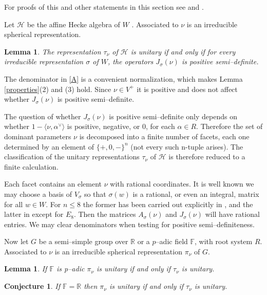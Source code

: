 \documentclass[11pt]{amsart}
\newtheorem{lemma}[equation]{Lemma}
\newtheorem{conjecture}[equation]{Conjecture}
\renewcommand{\H}{{\mathcal H}}
\newcommand{\ch}[1]{#1^\vee}
\newcommand\brach[2]{\langle#1,\ch#2\rangle}
\begin{document}
For proofs of this and other statements in this section see
\cite{barbasch_spherical} and \cite{atlas_papers}.

Let $\H$ be the affine Hecke algebra of $W$ \cite[Chapter 7]{humphreys_coxeter}.
Associated to $\nu$ is an irreducible spherical representation.

\begin{lemma}
The representation $\tau_\nu$ of $\H$ is unitary if and only if 
for every irreducible representation $\sigma$ of $W$, the operators
$J_\sigma(\nu)$ is positive semi--definite.
\end{lemma}


The denominator in \eqref{A} is a convenient normalization, which
makes Lemma \ref{properties}(2) and (3) hold. 
Since
$\nu\in V^+$ it is positive and does not affect whether
$J_\sigma(\nu)$ is positive semi--definite.

The question of whether $J_\sigma(\nu)$ is positive
semi--definite only depends on whether $1-\brach\nu\alpha$ is
positive, negative, or $0$, for each $\alpha\in R$. Therefore the set
of dominant parameters $\nu$ is decomposed into a finite number of
facets, each one determined by an element of $\{+,0,-\}^n$ (not every
such n-tuple arises). 
The classification of the unitary representations $\tau_\nu$ of 
$\H$ is therefore reduced to a finite calculation.


Each facet contains an element $\nu$ with rational coordinates. It is
well known we may choose a basis of $V_\sigma$ so that $\sigma(w)$ is
a rational, or even an integral, matrix for all $w\in W$. For $n\le 8$
the former has been carried out explicitly in \cite{stembridge_models}, and
the latter in \cite{adams_models} except for $E_8$. Then the matrices
$A_\sigma(\nu)$ and $J_\sigma(\nu)$ will have rational
entries.  We may clear denominators when testing for positive
semi--definiteness. 

Now let $G$ be a semi--simple group over $\mathbb R$ or a $p$--adic
field $\mathbb F$, with root system
$R$.  Associated to $\nu$ is an irreducible spherical representation
$\pi_\nu$ of $G$.

\begin{lemma}
\label{padic}
If $\mathbb F$ is p--adic $\pi_\nu$ is unitary if and only if $\tau_\nu$ is unitary.
\end{lemma}

\begin{conjecture}
\label{conjecture}
If $\mathbb F=\mathbb R$ then $\pi_\nu$ is unitary if and only if
$\tau_\nu$ is unitary.
\end{conjecture}
\end{document}
